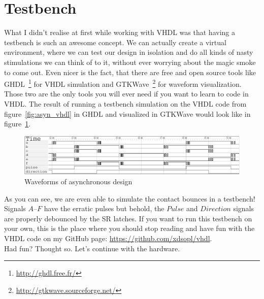 \documentclass[a4paper]{article}
\begin{document}
\section{Testbench}
What I didn't realise at first while working with VHDL was that having a testbench is such an awesome concept.
We can actually create a virtual environment, where we can test our design in isolation and do all kinds of nasty stimulations we can think of to it, without ever worrying about the magic smoke to come out.
Even nicer is the fact, that there are free and open source tools like GHDL~\footnote{\url{http://ghdl.free.fr/}} for VHDL simulation and GTKWave~\footnote{\url{http://gtkwave.sourceforge.net/}} for waveform visualization.
Those two are the only tools you will ever need if you want to learn to code in VHDL.
The result of running a testbench simulation on the VHDL code from figure~\ref{fig:asyn_vhdl} in GHDL and visualized in GTKWave would look like in figure~\ref{fig:asyn_wave}.
\begin{figure}[h]
\centering
\includegraphics[width=\textwidth]{asynchronous_quadrature_decoder_gtkwave.pdf}
\caption{Waveforms of asynchronous design}
\label{fig:asyn_wave}
\end{figure}
As you can see, we are even able to simulate the contact bounces in a testbench!
Signals $A$--$F$ have the erratic pulses but behold, the $Pulse$ and $Direction$ signals are properly debounced by the SR latches.
If you want to run this testbench on your own, this is the place where you should stop reading and have fun with the VHDL code on my GitHub page: \url{https://github.com/xdsopl/vhdl}.
\\Had fun? Thought so. Let's continue with the hardware.
\end{document}
